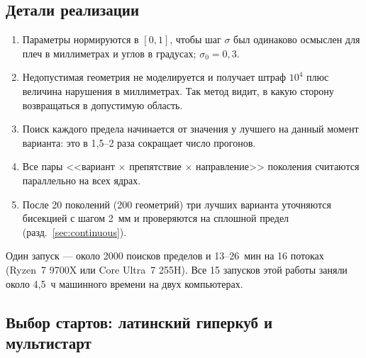 \documentclass[11pt,a4paper]{article}
\begin{document}
\subsection{Детали реализации}

\begin{enumerate}
  \item Параметры нормируются в $[0,1]$, чтобы шаг $\sigma$ был одинаково осмыслен для плеч
        в миллиметрах и углов в градусах; $\sigma_0=0{,}3$.
  \item Недопустимая геометрия не моделируется и получает штраф $10^4$ плюс величина нарушения
        в миллиметрах. Так метод видит, в какую сторону возвращаться в допустимую область.
  \item Поиск каждого предела начинается от значения у лучшего на данный момент варианта:
        это в 1,5--2 раза сокращает число прогонов.
  \item Все пары <<вариант $\times$ препятствие $\times$ направление>> поколения считаются
        параллельно на всех ядрах.
  \item После 20 поколений (200 геометрий) три лучших варианта уточняются бисекцией с шагом
        2~мм и проверяются на сплошной предел (разд.~\ref{sec:continuous}).
\end{enumerate}
Один запуск --- около 2000 поисков пределов и 13--26~мин на 16 потоках (Ryzen~7 9700X или
Core Ultra~7 255H). Все 15 запусков этой работы заняли около 4,5~ч машинного времени
на двух компьютерах.

\subsection{Выбор стартов: латинский гиперкуб и мультистарт}
\label{sec:starts}
\end{document}
